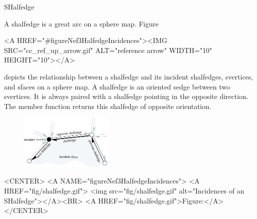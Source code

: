 
\ccRefPageBegin



\begin{ccRefClass}{SHalfedge}

\ccDefinition

A shalfedge is a great arc on a sphere map. 
Figure~\begin{ccHtmlOnly}
  <A HREF="#figureNef3HalfedgeIncidences"><IMG 
  SRC="cc_ref_up_arrow.gif" ALT="reference arrow" WIDTH="10" HEIGHT="10"></A>
\end{ccHtmlOnly}
depicts the relationship between a shalfedge and its incident
shalfedges, svertices, and sfaces on a sphere map.  A shalfedge is 
an oriented sedge between two svertices. It is always paired with a 
shalfedge pointing in
the opposite direction. The  member function returns
this shalfedge of opposite orientation.

\begin{ccTexOnly}
    \begin{figure}[bht]
        \begin{center}
          \parbox{0.4\textwidth}{%
              \includegraphics[width=0.4\textwidth]{Nef_3_ref/fig/shalfedge}%
          }
        \end{center}
        \label{figureNef3HalfedgeIncidences}
    \end{figure}
\end{ccTexOnly}

\begin{ccHtmlOnly}
    <CENTER>
    <A NAME="figureNef3HalfedgeIncidences">
    <A HREF="fig/shalfedge.gif">
        <img src="fig/shalfedge.gif" 
             alt="Incidences of an SHalfedge"></A><BR>
    <A HREF="fig/shalfedge.gif">Figure:</A>
    </CENTER>
\end{ccHtmlOnly}


\end{ccRefClass}
